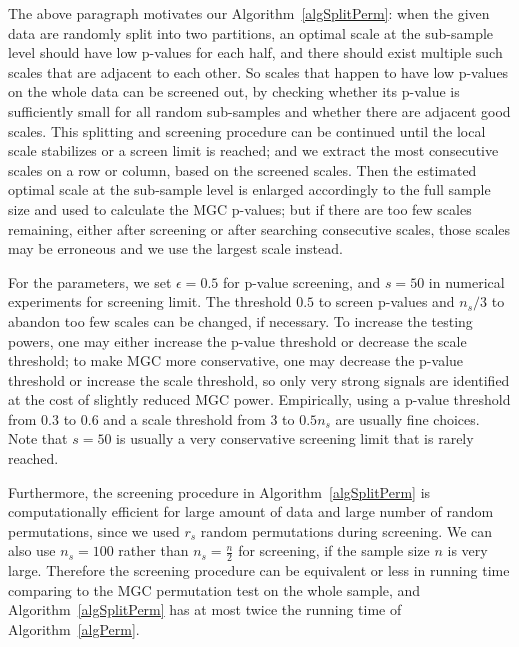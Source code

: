 \documentclass[11pt]{article}
\begin{document}
The above paragraph motivates our Algorithm~\ref{algSplitPerm}: when the given data are randomly split into two partitions, an optimal scale at the sub-sample level should have low p-values for each half, and there should exist multiple such scales that are adjacent to each other. So scales that happen to have low p-values on the whole data can be screened out, by checking whether its p-value is sufficiently small for all random sub-samples and whether there are adjacent good scales. This splitting and screening procedure can be continued until the local scale stabilizes or a screen limit is reached; and we extract the most consecutive scales on a row or column, based on the screened scales. Then the estimated optimal scale at the sub-sample level is enlarged accordingly to the full sample size and used to calculate the MGC p-values; but if there are too few scales remaining, either after screening or after searching consecutive scales, those scales may be erroneous and we use the largest scale instead. 

For the parameters, we set $\epsilon=0.5$ for p-value screening, and $s=50$ in numerical experiments for screening limit. The threshold $0.5$ to screen p-values and $n_{s}/3$ to abandon too few scales can be changed, if necessary. To increase the testing powers, one may either increase the p-value threshold or decrease the scale threshold; to make MGC more conservative, one may decrease the p-value threshold or increase the scale threshold, so only very strong signals are identified at the cost of slightly reduced MGC power. Empirically, using a p-value threshold from $0.3$ to $0.6$ and a scale threshold from $3$ to $0.5n_{s}$ are usually fine choices. Note that $s=50$ is usually a very conservative screening limit that is rarely reached.

Furthermore, the screening procedure in Algorithm~\ref{algSplitPerm} is computationally efficient for large amount of data and large number of random permutations, since we used $r_{s}$ random permutations during screening. We can also use $n_{s}=100$ rather than $n_{s}=\frac{n}{2}$ for screening, if the sample size $n$ is very large. Therefore the screening procedure can be equivalent or less in running time comparing to the MGC permutation test on the whole sample, and Algorithm~\ref{algSplitPerm} has at most twice the running time of Algorithm~\ref{algPerm}.
\end{document}
